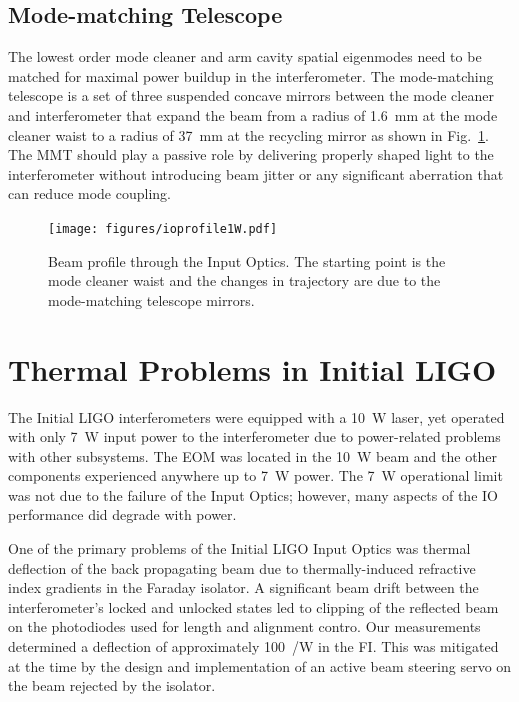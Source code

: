 \subsection{Mode-matching Telescope}
The lowest order mode cleaner and arm cavity spatial eigenmodes need
to be matched for maximal power buildup in the interferometer. The
mode-matching telescope is a set of three suspended concave mirrors
between the mode cleaner and interferometer that expand the beam from
a radius of 1.6~mm at the mode cleaner waist to a radius of 37~mm at
the recycling mirror as shown in Fig.~\ref{fig:ioprofile}. The MMT
should play a passive role by delivering properly shaped light to the
interferometer without introducing beam jitter or any significant
aberration that can reduce mode coupling.

\begin{figure}
\begin{centering}
\texttt{[image: figures/ioprofile1W.pdf]}
\caption[Beam profile through the Input Optics]{Beam profile through
  the Input Optics. The starting point is the mode cleaner waist and
  the changes in trajectory are due to the mode-matching telescope
  mirrors.}
\label{fig:ioprofile}
\end{centering}
\end{figure}

\section{Thermal Problems in Initial LIGO}
\label{sec:problems}
The Initial LIGO interferometers were equipped with a 10~W laser, yet
operated with only 7~W input power to the interferometer due to
power-related problems with other subsystems. The EOM was located in
the 10~W beam and the other components experienced anywhere up to 7~W
power. The 7~W operational limit was not due to the failure of the
Input Optics; however, many aspects of the IO performance did degrade
with power.

One of the primary problems of the Initial LIGO Input Optics
\citep{Adhikari1998Input} was thermal deflection of the back
propagating beam due to thermally-induced refractive index gradients
in the Faraday isolator. A significant beam drift between the
interferometer's locked and unlocked states led to clipping of the
reflected beam on the photodiodes used for length and alignment
contro. Our measurements determined a deflection of approximately
100~\microrad/W in the FI.  This was mitigated at the time by the
design and implementation of an active beam steering servo on the beam
rejected by the isolator.

